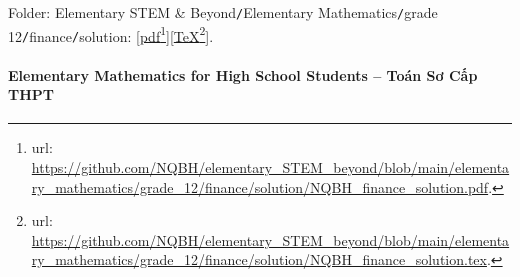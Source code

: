 \documentclass[12pt]{article}
\begin{document}
\begin{itemize}
\begin{itemize}
		Folder: {\sf Elementary STEM \& Beyond{\tt/}Elementary Mathematics{\tt/}grade 12{\tt/}finance{\tt/}solution}: [\href{https://github.com/NQBH/elementary_STEM_beyond/blob/main/elementary_mathematics/grade_12/finance/solution/NQBH_finance_solution.pdf}{pdf}\footnote{{\sc url}: \url{https://github.com/NQBH/elementary_STEM_beyond/blob/main/elementary_mathematics/grade_12/finance/solution/NQBH_finance_solution.pdf}.}][\href{https://github.com/NQBH/elementary_STEM_beyond/blob/main/elementary_mathematics/grade_12/finance/solution/NQBH_finance_solution.tex}{\TeX}\footnote{{\sc url}: \url{https://github.com/NQBH/elementary_STEM_beyond/blob/main/elementary_mathematics/grade_12/finance/solution/NQBH_finance_solution.tex}.}].
	\end{itemize}
\end{itemize}

\paragraph{Elementary Mathematics for High School Students -- Toán Sơ Cấp THPT}
\end{document}
